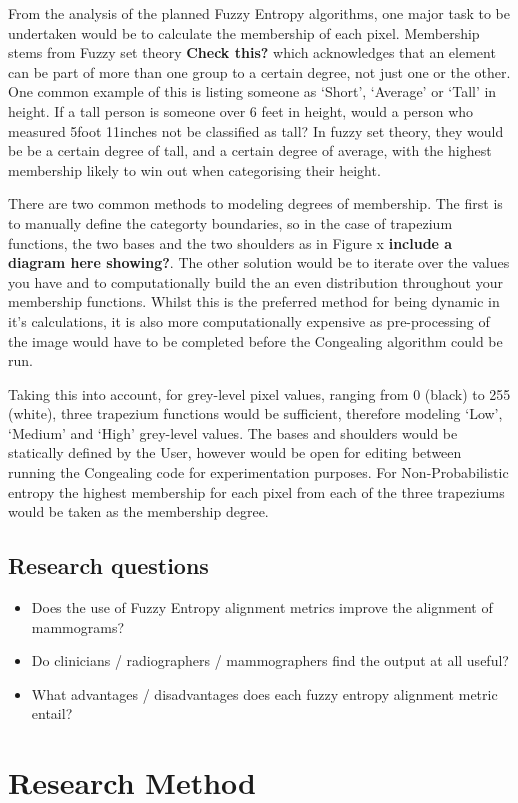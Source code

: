 From the analysis of the planned Fuzzy Entropy algorithms, one major task to be undertaken would be to calculate the membership of each pixel. Membership stems from Fuzzy set theory \textbf{Check this?} which acknowledges that an element can be part of more than one group to a certain degree, not just one or the other. One common example of this is listing someone as `Short', `Average' or `Tall' in height. If a tall person is someone over 6 feet in height, would a person who measured 5foot 11inches not be classified as tall? In fuzzy set theory, they would be be a certain degree of tall, and a certain degree of average, with the highest membership likely to win out when categorising their height.

There are two common methods to modeling degrees of membership. The first is to manually define the categorty boundaries, so in the case of trapezium functions, the two bases and the two shoulders as in Figure x \textbf{include a diagram here showing?}. The other solution would be to iterate over the values you have and to computationally build the an even distribution throughout your membership functions. Whilst this is the preferred method for being dynamic in it's calculations, it is also more computationally expensive as pre-processing of the image would have to be completed before the Congealing algorithm could be run.

Taking this into account, for grey-level pixel values, ranging from 0 (black) to 255 (white), three trapezium functions would be sufficient, therefore modeling `Low', `Medium' and `High' grey-level values. The bases and shoulders would be statically defined by the User, however would be open for editing between running the Congealing code for experimentation purposes. For Non-Probabilistic entropy the highest membership for each pixel from each of the three trapeziums would be taken as the membership degree.

\subsection{Research questions}
\begin{itemize}
\item Does the use of Fuzzy Entropy alignment metrics improve the alignment of mammograms?
\item Do clinicians / radiographers / mammographers find the output at all useful?
\item What advantages / disadvantages does each fuzzy entropy alignment metric entail?
\end{itemize}

\section{Research Method}
